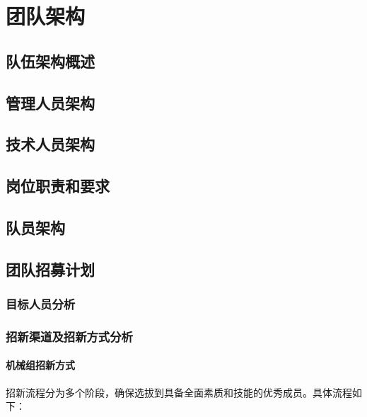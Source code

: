 \section{团队架构}

    \subsection{队伍架构概述}
    
        \noindent
    
    \subsection{管理人员架构}

    \subsection{技术人员架构}

    \subsection{岗位职责和要求}
    
    \subsection{队员架构}

    \subsection{团队招募计划}

        \subsubsection{目标人员分析}

        \subsubsection{招新渠道及招新方式分析}

            \paragraph{机械组招新方式}

                招新流程分为多个阶段，确保选拔到具备全面素质和技能的优秀成员。具体流程如下：

